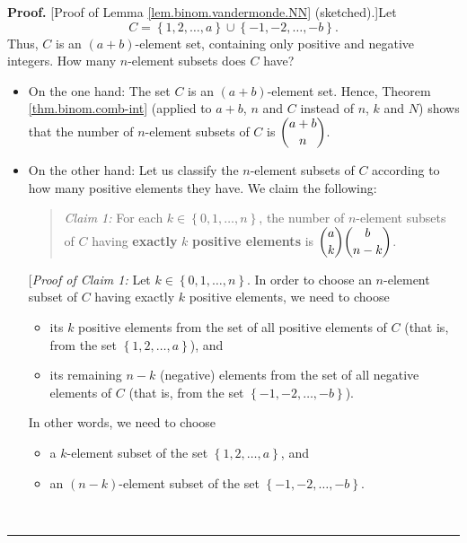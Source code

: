 \documentclass[numbers=enddot,12pt,final,onecolumn,notitlepage]{scrartcl}%
\numberwithin{exer}{subsection}
\theoremstyle{definition}
\newenvironment{statement}{\begin{quote}}{\end{quote}}
\newenvironment{proof}[1][Proof]{\noindent\textbf{#1.} }{\ \rule{0.5em}{0.5em}}
\begin{document}
\begin{proof}
[Proof of Lemma \ref{lem.binom.vandermonde.NN} (sketched).]Let%
\[
C=\left\{  1,2,\ldots,a\right\}  \cup\left\{  -1,-2,\ldots,-b\right\}  .
\]
Thus, $C$ is an $\left(  a+b\right)  $-element set, containing only positive
and negative integers. How many $n$-element subsets does $C$ have?

\begin{itemize}
\item On the one hand: The set $C$ is an $\left(  a+b\right)  $-element set.
Hence, Theorem \ref{thm.binom.comb-int} (applied to $a+b$, $n$ and $C$ instead
of $n$, $k$ and $N$) shows that the number of $n$-element subsets of $C$ is
$\dbinom{a+b}{n}$.

\item On the other hand: Let us classify the $n$-element subsets of $C$
according to how many positive elements they have. We claim the following:

\begin{statement}
\textit{Claim 1:} For each $k\in\left\{  0,1,\ldots,n\right\}  $, the number
of $n$-element subsets of $C$ having \textbf{exactly }$k$ \textbf{positive
elements} is $\dbinom{a}{k}\dbinom{b}{n-k}$.
\end{statement}

[\textit{Proof of Claim 1:} Let $k\in\left\{  0,1,\ldots,n\right\}  $. In
order to choose an $n$-element subset of $C$ having exactly $k$ positive
elements, we need to choose

\begin{itemize}
\item its $k$ positive elements from the set of all positive elements of $C$
(that is, from the set $\left\{  1,2,\ldots,a\right\}  $), and

\item its remaining $n-k$ (negative) elements from the set of all negative
elements of $C$ (that is, from the set $\left\{  -1,-2,\ldots,-b\right\}  $).
\end{itemize}

In other words, we need to choose

\begin{itemize}
\item a $k$-element subset of the set $\left\{  1,2,\ldots,a\right\}  $, and

\item an $\left(  n-k\right)  $-element subset of the set $\left\{
-1,-2,\ldots,-b\right\}  $.
\end{itemize}


\end{itemize}
\end{proof}
\end{document}
